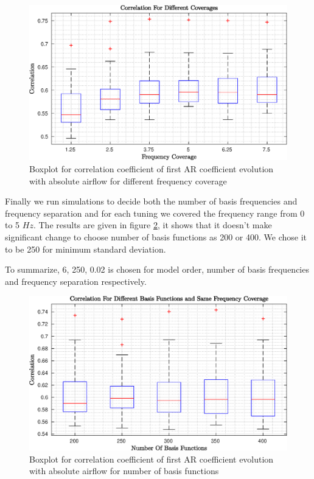 \begin{figure}
	\begin{center}
		\includegraphics[width=\textwidth]{figures/corr_abs_for_tvar_frange_selection.eps}
		\caption{Boxplot for correlation coefficient of first AR coefficient evolution with absolute airflow for different frequency coverage}
		\label{fig:abs_airflow_tvar_freq_range}
	\end{center}
\end{figure}
Finally we run simulations to decide both the number of basis frequencies and frequency separation and for each tuning we covered the frequency range from 0 to 5 $Hz$. The results are given in figure \ref{fig:abs_airflow_tvar_numbasis_selection}, it shows that it doesn't make significant change to choose number of basis functions as 200 or 400. We chose it to be 250 for minimum standard deviation. \par 
To summarize, 6, 250, 0.02 is chosen for model order, number of basis frequencies and frequency separation respectively.
\begin{figure}
	\begin{center}
		\includegraphics[width=\textwidth]{figures/corr_abs_for_tvar_numbasis_selection.eps}
		\caption{Boxplot for correlation coefficient of first AR coefficient evolution with absolute airflow for number of basis functions}
		\label{fig:abs_airflow_tvar_numbasis_selection}
	\end{center}
\end{figure} \par 

